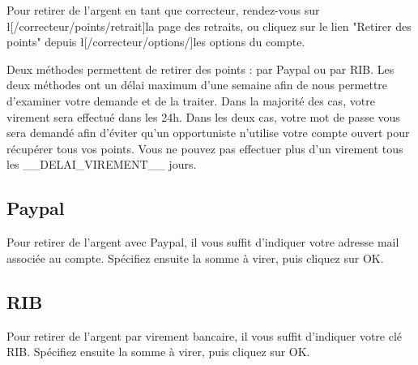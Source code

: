 ﻿Pour retirer de l'argent en tant que correcteur, rendez-vous sur \l[/correcteur/points/retrait]{la page des retraits}, ou cliquez sur le lien "Retirer des points" depuis \l[/correcteur/options/]{les options du compte}.

Deux méthodes permettent de retirer des points : par Paypal ou par RIB.
Les deux méthodes ont un délai maximum d'une semaine afin de nous permettre d'examiner votre demande et de la traiter. Dans la majorité des cas, votre virement sera effectué dans les 24h.
Dans les deux cas, votre mot de passe vous sera demandé afin d'éviter qu'un opportuniste n'utilise votre compte ouvert pour récupérer tous vos points.
Vous ne pouvez pas effectuer plus d'un virement tous les __DELAI_VIREMENT__ jours.

\subsection{Paypal}
Pour retirer de l'argent avec Paypal, il vous suffit d'indiquer votre adresse mail associée au compte.
Spécifiez ensuite la somme à virer, puis cliquez sur OK.

\subsection{RIB}
Pour retirer de l'argent par virement bancaire, il vous suffit d'indiquer votre clé RIB.
Spécifiez ensuite la somme à virer, puis cliquez sur OK.